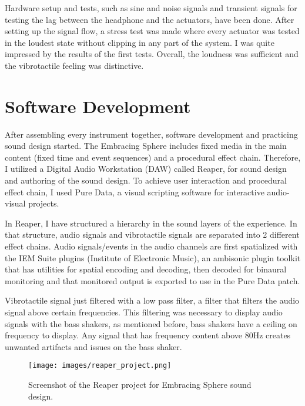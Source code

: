         Hardware setup and tests, such as sine and noise signals and transient signals for testing the lag between the headphone and the actuators, have been done. After setting up the signal flow, a stress test was made where every actuator was tested in the loudest state without clipping in any part of the system. I was quite impressed by the results of the first tests. Overall, the loudness was sufficient and the vibrotactile feeling was distinctive.\par

    \section{Software Development}
        After assembling every instrument together, software development and practicing sound design started. The Embracing Sphere includes fixed media in the main content (fixed time and event sequences) and a procedural effect chain. Therefore, I utilized a Digital Audio Workstation (DAW) called Reaper, for sound design and authoring of the sound design. To achieve user interaction and procedural effect chain, I used Pure Data, a visual scripting software for interactive audio-visual projects.\par

        In Reaper, I have structured a hierarchy in the sound layers of the experience. In that structure, audio signals and vibrotactile signals are separated into 2 different effect chains. Audio signals/events in the audio channels are first spatialized with the IEM Suite plugins (Institute of Electronic Music), an ambisonic plugin toolkit that has utilities for spatial encoding and decoding, then decoded for binaural monitoring and that monitored output is exported to use in the Pure Data patch.\par

        Vibrotactile signal just filtered with a low pass filter, a filter that filters the audio signal above certain frequencies. This filtering was necessary to display audio signals with the bass shakers, as mentioned before, bass shakers have a ceiling on frequency to display. Any signal that has frequency content above 80Hz creates unwanted artifacts and issues on the bass shaker.\par

        \begin{figure}[H]
            \centering
            \texttt{[image: images/reaper\_project.png]}
            \caption{Screenshot of the Reaper project for Embracing Sphere sound design.}
            \label{fig:REAPER}
        \end{figure} 

